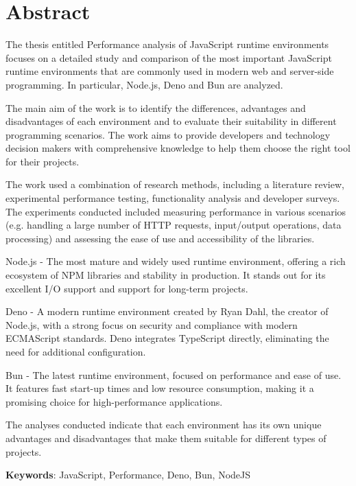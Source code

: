 \section*{Abstract}
The thesis entitled Performance analysis of JavaScript runtime environments focuses on a detailed study and comparison of the most important JavaScript runtime environments that are commonly used in modern web and server-side programming. In particular, Node.js, Deno and Bun are analyzed.

The main aim of the work is to identify the differences, advantages and disadvantages of each environment and to evaluate their suitability in different programming scenarios. The work aims to provide developers and technology decision makers with comprehensive knowledge to help them choose the right tool for their projects.

The work used a combination of research methods, including a literature review, experimental performance testing, functionality analysis and developer surveys. The experiments conducted included measuring performance in various scenarios (e.g. handling a large number of HTTP requests, input/output operations, data processing) and assessing the ease of use and accessibility of the libraries.

Node.js - The most mature and widely used runtime environment, offering a rich ecosystem of NPM libraries and stability in production. It stands out for its excellent I/O support and support for long-term projects.

Deno - A modern runtime environment created by Ryan Dahl, the creator of Node.js, with a strong focus on security and compliance with modern ECMAScript standards. Deno integrates TypeScript directly, eliminating the need for additional configuration.

Bun - The latest runtime environment, focused on performance and ease of use. It features fast start-up times and low resource consumption, making it a promising choice for high-performance applications.

The analyses conducted indicate that each environment has its own unique advantages and disadvantages that make them suitable for different types of projects.

\bigskip

\textbf{Keywords}: JavaScript, Performance, Deno, Bun, NodeJS
